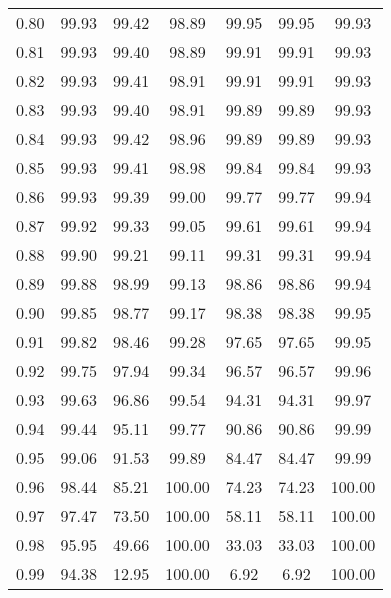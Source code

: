 \begin{tabular}{|c|c|c|c|c|c|c|}
      0.80 &     99.93 &     99.42 &      98.89 &   99.95 &      99.95 &         99.93 \\
      0.81 &     99.93 &     99.40 &      98.89 &   99.91 &      99.91 &         99.93 \\
      0.82 &     99.93 &     99.41 &      98.91 &   99.91 &      99.91 &         99.93 \\
      0.83 &     99.93 &     99.40 &      98.91 &   99.89 &      99.89 &         99.93 \\
      0.84 &     99.93 &     99.42 &      98.96 &   99.89 &      99.89 &         99.93 \\
      0.85 &     99.93 &     99.41 &      98.98 &   99.84 &      99.84 &         99.93 \\
      0.86 &     99.93 &     99.39 &      99.00 &   99.77 &      99.77 &         99.94 \\
      0.87 &     99.92 &     99.33 &      99.05 &   99.61 &      99.61 &         99.94 \\
      0.88 &     99.90 &     99.21 &      99.11 &   99.31 &      99.31 &         99.94 \\
      0.89 &     99.88 &     98.99 &      99.13 &   98.86 &      98.86 &         99.94 \\
      0.90 &     99.85 &     98.77 &      99.17 &   98.38 &      98.38 &         99.95 \\
      0.91 &     99.82 &     98.46 &      99.28 &   97.65 &      97.65 &         99.95 \\
      0.92 &     99.75 &     97.94 &      99.34 &   96.57 &      96.57 &         99.96 \\
      0.93 &     99.63 &     96.86 &      99.54 &   94.31 &      94.31 &         99.97 \\
      0.94 &     99.44 &     95.11 &      99.77 &   90.86 &      90.86 &         99.99 \\
      0.95 &     99.06 &     91.53 &      99.89 &   84.47 &      84.47 &         99.99 \\
      0.96 &     98.44 &     85.21 &     100.00 &   74.23 &      74.23 &        100.00 \\
      0.97 &     97.47 &     73.50 &     100.00 &   58.11 &      58.11 &        100.00 \\
      0.98 &     95.95 &     49.66 &     100.00 &   33.03 &      33.03 &        100.00 \\
      0.99 &     94.38 &     12.95 &     100.00 &    6.92 &       6.92 &        100.00 \\
\bottomrule
\end{tabular}
